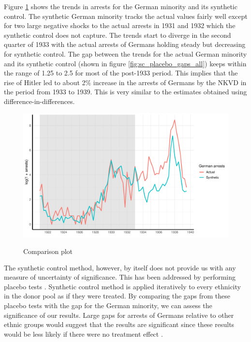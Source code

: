 Figure \ref{fig_sc_comp_plot} shows the trends in arrests for the German minority and its synthetic control. The synthetic German minority tracks the actual values fairly well except for two large negative shocks to the actual arrests in 1931 and 1932 which the synthetic control does not capture. The trends start to diverge in the second quarter of 1933 with the actual arrests of Germans holding steady but decreasing for synthetic control. 
The gap between the trends for the actual German minority and its synthetic control (shown in figure \ref{fig:sc_placebo_gaps_all}) keeps within the range of 1.25 to 2.5 for most of the post-1933 period. This implies that the rise of Hitler led to about  2\% increase in the arrests of Germans by the NKVD  in the period from 1933 to 1939. This is very similar to the estimates obtained using difference-in-differences. 
\begin{figure}[h]
\centering
\caption{Comparison plot}
\includegraphics[width=\textwidth]{plots/synthetic_control/until_pact/comparison_plot.pdf}
\label{fig_sc_comp_plot}
\end{figure}


The synthetic control method, however, by itself does not provide us with any measure of uncertainty of significance. This has been addressed by performing placebo tests \citep{abadie_synthetic_2010}. Synthetic control method is applied iteratively to every ethnicity in the donor pool
as if they were treated. By comparing the gaps from these placebo tests with the gap for the German minority, we can assess the
significance of our results.
Large gaps for arrests of Germans relative to other ethnic groups would suggest that the results are significant since these results would be less likely if there were no treatment effect . 

